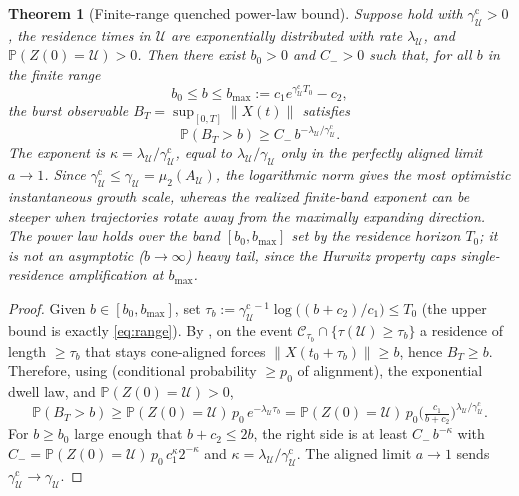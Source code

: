 \documentclass[11pt]{article}
\theoremstyle{plain}
\newtheorem{theorem}{Theorem}[section]
\theoremstyle{definition}
\theoremstyle{remark}
\newcommand{\Prob}{\mathbb{P}}
\newcommand{\lognorm}{\mu_2}
\newcommand{\norm}[1]{\left\lVert #1 \right\rVert}
\newcommand{\HR}{\mathcal{U}}
\begin{document}
\begin{theorem}[Finite-range quenched power-law bound]
\label{thm:quenched}
Suppose  hold with $\gamma_\HR^{\mathrm c}>0$, the residence
times in $\HR$ are exponentially distributed with rate $\lambda_\HR$, and $\Prob(Z(0)=\HR)>0$.
Then there exist $b_0>0$ and $C_->0$ such that, for all $b$ in the finite range
\begin{equation}
\label{eq:range}
b_0\le b\le b_{\max}:=c_1 e^{\gamma_\HR^{\mathrm c}T_0}-c_2 ,
\end{equation}
the burst observable $B_T=\sup_{[0,T]}\norm{X(t)}$ satisfies
\begin{equation}
\label{eq:tail}
\Prob(B_T>b)\ge C_-\,b^{-\lambda_\HR/\gamma_\HR^{\mathrm c}} .
\end{equation}
The exponent is $\kappa=\lambda_\HR/\gamma_\HR^{\mathrm c}$, equal to $\lambda_\HR/\gamma_\HR$ only
in the perfectly aligned limit $a\to1$. Since $\gamma_\HR^{\mathrm c}\le\gamma_\HR=\lognorm(A_\HR)$,
the logarithmic norm gives the most optimistic instantaneous growth scale, whereas the realized
finite-band exponent can be steeper when trajectories rotate away from the maximally expanding
direction. The power law holds over the band $[b_0,b_{\max}]$ set by the residence horizon $T_0$;
it is \emph{not} an asymptotic ($b\to\infty$) heavy tail, since the Hurwitz property caps
single-residence amplification at $b_{\max}$.
\end{theorem}

\begin{proof}
Given $b\in[b_0,b_{\max}]$, set $\tau_b:=\gamma_\HR^{\mathrm c\,-1}\log\!\big((b+c_2)/c_1\big)\le
T_0$ (the upper bound is exactly \eqref{eq:range}). By , on the event
$\mathcal{C}_{\tau_b}\cap\{\tau(\HR)\ge\tau_b\}$ a residence of length $\ge\tau_b$ that stays
cone-aligned forces $\norm{X(t_0+\tau_b)}\ge b$, hence $B_T\ge b$. Therefore, using
 (conditional probability $\ge p_0$ of alignment), the exponential dwell law, and
$\Prob(Z(0)=\HR)>0$,
\[
\Prob(B_T>b)\ge\Prob(Z(0)=\HR)\,p_0\,e^{-\lambda_\HR\tau_b}
=\Prob(Z(0)=\HR)\,p_0\Big(\tfrac{c_1}{b+c_2}\Big)^{\lambda_\HR/\gamma_\HR^{\mathrm c}}.
\]
For $b\ge b_0$ large enough that $b+c_2\le2b$, the right side is at least
$C_-\,b^{-\kappa}$ with $C_-=\Prob(Z(0)=\HR)\,p_0\,c_1^{\kappa}2^{-\kappa}$ and
$\kappa=\lambda_\HR/\gamma_\HR^{\mathrm c}$. The aligned limit $a\to1$ sends
$\gamma_\HR^{\mathrm c}\to\gamma_\HR$.
\end{proof}
\end{document}

